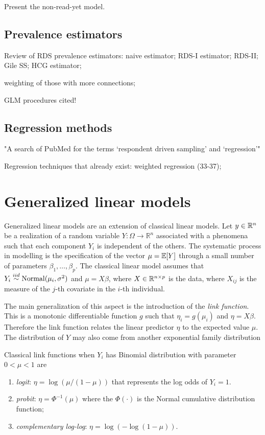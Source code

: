 Present the non-read-yet model. 

\subsection{Prevalence estimators}

Review of RDS prevalence estimators: naive estimator; RDS-I estimator;
RDS-II; Gile SS; HCG estimator;

weighting of those with more connections; 

GLM procedures cited!

\subsection{Regression methods}

"A search of PubMed for the terms ‘respondent driven sampling’ and
‘regression’"

Regression techniques that already exist: weighted regression (33-37);

\section{Generalized linear models}
\label{sec:glm}

Generalized linear models are an extension of classical linear models. 
Let $y \in \mathbb{R}^{n}$ be a realization of a random variable 
$Y : \Omega \to \mathbb{R}^n$ associated with a phenomena such that each 
component $Y_i$ is independent of the others. The systematic process in 
modelling is the specification of the vector $\mu = \mathbb{E}[Y]$ through a small 
number of parameters $\beta_1, \dots, \beta_p$. The classical linear model 
assumes that $Y_i \overset{iid}{\sim} \operatorname{Normal}(\mu_i, \sigma^2)$ and $\mu = X\beta$,
where $X \in \mathbb{R}^{n \times p}$ is the data, where $X_{ij}$ is the measure 
of the $j$-th covariate in the $i$-th individual. 

The main generalization of this aspect is the introduction of the 
\textit{link function}. This is a monotonic differentiable function $g$ 
such that $\eta_i = g(\mu_i)$ and $\eta = X\beta$. Therefore the link 
function relates the linear predictor $\eta$ to the expected value $\mu$. 
The distribution of $Y$ 
may also come from another exponential family distribution 

Classical link functions when $Y_i$ has Binomial distribution with 
parameter $0 < \mu < 1$ are 

\begin{enumerate}
  \item \textit{logit}: $\eta = \log(\mu / (1 - \mu))$ that represents 
  the log odds of $Y_i = 1$. 
  \item \textit{probit}: $\eta = \Phi^{-1}(\mu)$ where the $\Phi(\cdot)$ 
  is the Normal cumulative distribution function; 
  \item \textit{complementary log-log}: $\eta = \log(-\log(1 - \mu))$.
\end{enumerate}


